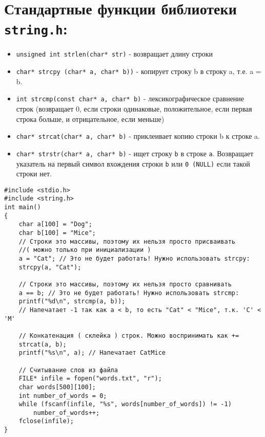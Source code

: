 \documentclass{article}
\begin{document}
\section*{Стандартные функции библиотеки \texttt{string.h}:}
\begin{itemize}
\item \texttt{unsigned int strlen(char* str)} - возвращает длину строки
\item \texttt{char* strcpy (char* a, char* b))} - копирует строку b в строку a, т.е. a = b.
\item \texttt{int strcmp(const char* a, char* b)} - лексикографическое сравнение строк (возвращает 0, если строки одинаковые, положительное, если первая строка больше, и отрицательное, если меньше)
\item \texttt{char* strcat(char* a, char* b)} - приклеивает копию строки b к строке a.
\item \texttt{char* strstr(char* a, char* b)} - ищет строку \texttt{b} в строке \texttt{a}. Возвращает указатель на первый символ вхождения строки \texttt{b} или \texttt{0 (NULL)} если такой строки нет.
\end{itemize}
\begin{lstlisting}
#include <stdio.h>
#include <string.h>
int main() 
{
	char a[100] = "Dog";
	char b[100] = "Mice";
	// Строки это массивы, поэтому их нельзя просто присваивать 
	//( можно только при инициализации )
	a = "Cat"; // Это не будет работать! Нужно использовать strcpy:
	strcpy(a, "Cat");
	
	// Строки это массивы, поэтому их нельзя просто сравнивать
	a == b; // Это не будет работать! Нужно использовать strcmp:
	printf("%d\n", strcmp(a, b)); 
	// Напечатает -1 так как a < b, то есть "Cat" < "Mice", т.к. 'C' < 'M'
	
	// Конкатенация ( склейка ) строк. Можно воспринимать как +=
	strcat(a, b);
	printf("%s\n", a); // Напечатает CatMice
	
	// Считывание слов из файла
	FILE* infile = fopen("words.txt", "r");
	char words[500][100];
	int number_of_words = 0;
	while (fscanf(infile, "%s", words[number_of_words]) != -1)
		number_of_words++;
	fclose(infile);
}
\end{lstlisting}
\end{document}
